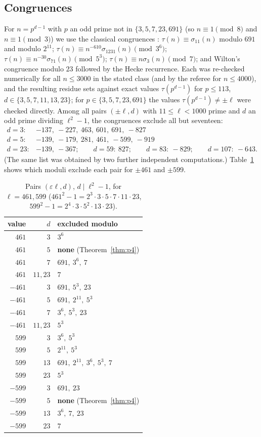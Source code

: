 \subsection{Congruences}
For $n=p^{d-1}$ with $p$ an odd prime not in $\{3,5,7,23,691\}$ (so $n\equiv1\pmod8$ and $n\equiv1\pmod3$) we use the classical congruences \cite{SwD}: $\tau(n)\equiv\sigma_{11}(n)$ modulo $691$ and modulo $2^{11}$; $\tau(n)\equiv n^{-610}\sigma_{1231}(n)\pmod{3^6}$; $\tau(n)\equiv n^{-30}\sigma_{71}(n)\pmod{5^3}$; $\tau(n)\equiv n\sigma_3(n)\pmod7$; and Wilton's congruence modulo $23$ followed by the Hecke recurrence. Each was re-checked numerically for all $n\le3000$ in the stated class (and by the referee for $n\le4000$), and the resulting residue sets against exact values $\tau(p^{d-1})$ for $p\le113$, $d\in\{3,5,7,11,13,23\}$; for $p\in\{3,5,7,23,691\}$ the values $\tau(p^{d-1})\ne\pm\ell$ were checked directly. Among all pairs $(\pm\ell,d)$ with $11\le\ell<1000$ prime and $d$ an odd prime dividing $\ell^2-1$, the congruences exclude all but seventeen:
\[
\begin{array}{ll}
d=3:&-137,\ -227,\ 463,\ 601,\ 691,\ -827\\
d=5:&-139,\ -179,\ 281,\ 461,\ -599,\ -919\\
d=23:&-139,\ -367;\qquad d=59:\ 827;\qquad d=83:\ -829;\qquad d=107:\ -643.
\end{array}
\]
(The same list was obtained by two further independent computations.) Table~\ref{tab:pairs} shows which moduli exclude each pair for $\pm461$ and $\pm599$.

\begin{table}[ht]\small
\caption{Pairs $(\varepsilon\ell,d)$, $d\mid\ell^2-1$, for $\ell=461,599$ ($461^2-1=2^3\cdot3\cdot5\cdot7\cdot11\cdot23$, $599^2-1=2^4\cdot3\cdot5^2\cdot13\cdot23$).}\label{tab:pairs}
\begin{tabular}{rr|l}\toprule
value&$d$&excluded modulo\\\midrule
$461$&$3$&$3^6$\\
$461$&$5$&\textbf{none} (Theorem~\ref{thm:p4})\\
$461$&$7$&$691,\ 3^6,\ 7$\\
$461$&$11,23$&$7$\\
$-461$&$3$&$691,\ 5^3,\ 23$\\
$-461$&$5$&$691,\ 2^{11},\ 5^3$\\
$-461$&$7$&$3^6,\ 5^3,\ 23$\\
$-461$&$11,23$&$5^3$\\
$599$&$3$&$3^6,\ 5^3$\\
$599$&$5$&$2^{11},\ 5^3$\\
$599$&$13$&$691,\ 2^{11},\ 3^6,\ 5^3,\ 7$\\
$599$&$23$&$5^3$\\
$-599$&$3$&$691,\ 23$\\
$-599$&$5$&\textbf{none} (Theorem~\ref{thm:p4})\\
$-599$&$13$&$3^6,\ 7,\ 23$\\
$-599$&$23$&$7$\\\bottomrule
\end{tabular}
\end{table}

